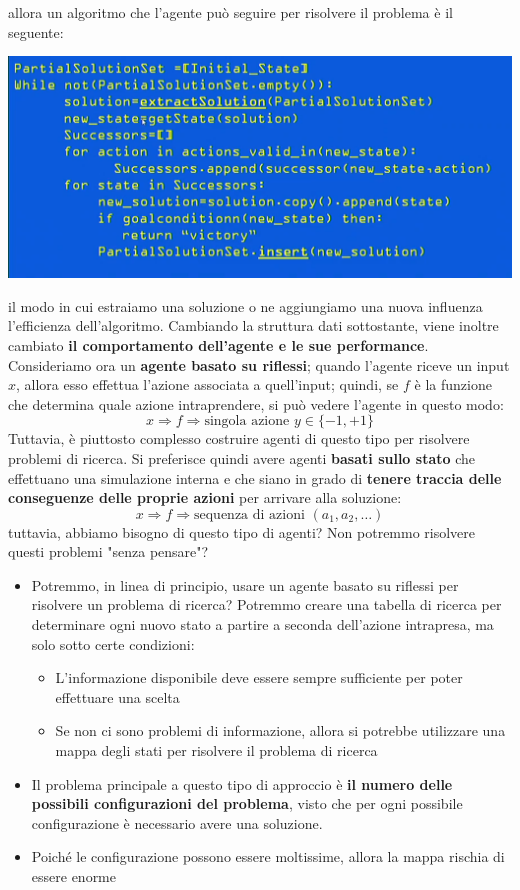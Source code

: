 \documentclass[12pt]{article}
\begin{document}
allora un algoritmo che l'agente può seguire per risolvere il problema è il seguente:
\begin{center}
    \includegraphics[width = 1\linewidth]{Images/22.PNG}
\end{center}
il modo in cui estraiamo una soluzione o ne aggiungiamo una nuova influenza l'efficienza dell'algoritmo.
Cambiando la struttura dati sottostante, viene inoltre cambiato \textbf{il comportamento dell'agente e le sue performance}.
Consideriamo ora un \textbf{agente basato su riflessi}; quando l'agente riceve un input $x$, allora esso effettua l'azione associata
a quell'input; quindi, se $f$ è la funzione che determina quale azione intraprendere, si può vedere l'agente in questo modo:
$$x \Rightarrow f \Rightarrow \textrm{singola azione } y \in \{-1, +1\}$$
Tuttavia, è piuttosto complesso costruire agenti di questo tipo per risolvere problemi di ricerca. Si preferisce quindi avere
agenti \textbf{basati sullo stato} che effettuano una simulazione interna e che siano in grado di \textbf{tenere traccia delle conseguenze delle proprie azioni} per arrivare alla soluzione:
$$x \Rightarrow f \Rightarrow \textrm{sequenza di azioni } (a_1, a_2, \dots)$$
tuttavia, abbiamo bisogno di questo tipo di agenti? Non potremmo risolvere questi problemi "senza pensare"?
\begin{itemize}
    \item Potremmo, in linea di principio, usare un agente basato su riflessi per risolvere un problema di ricerca? Potremmo creare una tabella di ricerca per determinare ogni nuovo stato a partire a seconda dell'azione intrapresa, ma solo sotto certe condizioni:
    \begin{itemize}
        \item L'informazione disponibile deve essere sempre sufficiente per poter effettuare una scelta
        \item Se non ci sono problemi di informazione, allora si potrebbe utilizzare una mappa degli stati per risolvere il problema di ricerca
    \end{itemize}
    \item Il problema principale a questo tipo di approccio è \textbf{il numero delle possibili configurazioni del problema}, visto che per ogni possibile configurazione è necessario avere una soluzione.
    \item Poiché le configurazione possono essere moltissime, allora la mappa rischia di essere enorme
\end{itemize}
\end{document}
